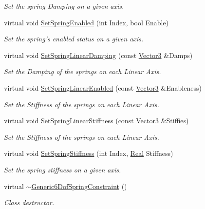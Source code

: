 \begin{DoxyCompactItemize}
\begin{DoxyCompactList}\small\item\em Set the spring Damping on a given axis. \item\end{DoxyCompactList}\item 
virtual void \hyperlink{classphys_1_1Generic6DofSpringConstraint_a49ab6cbd0859e455391b1b676b1309b7}{SetSpringEnabled} (int Index, bool Enable)
\begin{DoxyCompactList}\small\item\em Set the spring's enabled status on a given axis. \item\end{DoxyCompactList}\item 
virtual void \hyperlink{classphys_1_1Generic6DofSpringConstraint_a86776512ae4f20d4143aa4c8901ab355}{SetSpringLinearDamping} (const \hyperlink{classphys_1_1Vector3}{Vector3} \&Damps)
\begin{DoxyCompactList}\small\item\em Set the Damping of the springs on each Linear Axis. \item\end{DoxyCompactList}\item 
virtual void \hyperlink{classphys_1_1Generic6DofSpringConstraint_a561603d0470dc20eb74ee79cc1131c52}{SetSpringLinearEnabled} (const \hyperlink{classphys_1_1Vector3}{Vector3} \&Enableness)
\begin{DoxyCompactList}\small\item\em Set the Stiffness of the springs on each Linear Axis. \item\end{DoxyCompactList}\item 
virtual void \hyperlink{classphys_1_1Generic6DofSpringConstraint_a3cb5c0a8cfacc634728828eb85b2b025}{SetSpringLinearStiffness} (const \hyperlink{classphys_1_1Vector3}{Vector3} \&Stiffies)
\begin{DoxyCompactList}\small\item\em Set the Stiffness of the springs on each Linear Axis. \item\end{DoxyCompactList}\item 
virtual void \hyperlink{classphys_1_1Generic6DofSpringConstraint_a7a73106f73e23320cc84593aade54301}{SetSpringStiffness} (int Index, \hyperlink{namespacephys_af7eb897198d265b8e868f45240230d5f}{Real} Stiffness)
\begin{DoxyCompactList}\small\item\em Set the spring stiffness on a given axis. \item\end{DoxyCompactList}\item 
virtual \hyperlink{classphys_1_1Generic6DofSpringConstraint_a66a886a64c86a24ed34eacf4c8465f10}{$\sim$Generic6DofSpringConstraint} ()
\begin{DoxyCompactList}\small\item\em Class destructor. \item\end{DoxyCompactList}\end{DoxyCompactItemize}
